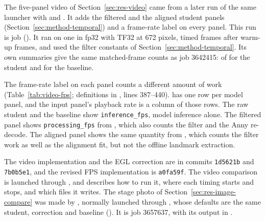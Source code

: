 The five-panel video of Section~\ref{sec:res-video} came from a later run of the same launcher with
 and . It adds the filtered and the aligned student panels
(Section~\ref{sec:method-temporal}) and a frame-rate label on every panel. This run is job \VideoJob{} (). It ran
on one \VideoGPU{} in fp32 with TF32 at 672 pixels, timed \VideoMeasuredFrames{} frames after \VideoWarmup{}
warm-up frames, and used the filter constants of Section~\ref{sec:method-temporal}. Its own summaries give the same
matched-frame counts as job 3642415: \VideoStudentMatched{} of \VideoFrames{} for the student and
\VideoBaselineMatched{} for the baseline.

The frame-rate label on each panel counts a different amount of work (Table~\ref{tab:video-fps}; definitions in
, lines 387--440).  has one row per model panel, and the input panel's
playback rate is a column of those rows. The raw student and the
baseline show \texttt{inference\_fps}, model inference alone. The filtered panel shows \texttt{processing\_fps} from
, which also counts the filter and the Anny re-decode. The aligned panel shows the
same quantity from , which counts the filter work as well as the alignment fit, but not the
offline landmark extraction.

The video implementation and the EGL correction are in commits \texttt{1d5621b} and \texttt{7b0b5e1}, and the revised
FPS implementation is \texttt{a0fa59f}. The video comparison is launched through , and
 describes how to run it, where each timing starts and stops, and which files it
writes. The stage photo of Section~\ref{sec:res-image-compare} was made by , normally
launched through , whose defaults are the same student, correction and baseline
(). It is job 3657637, with its output in
.

\endgroup
